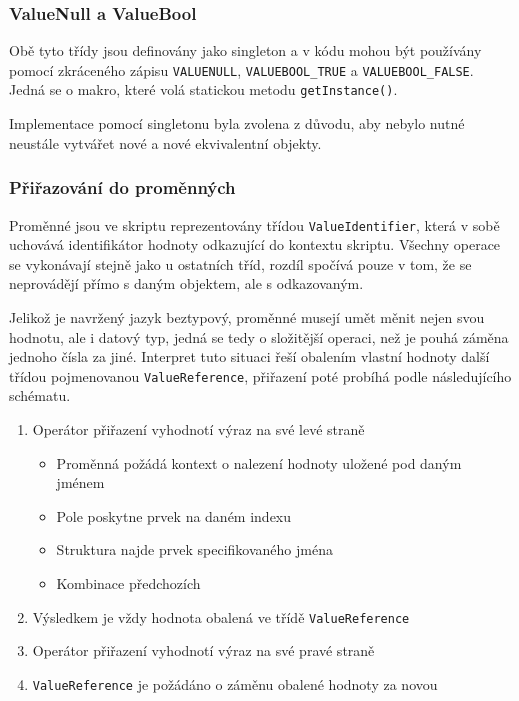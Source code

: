 \documentclass[11pt,twoside,a4paper]{book}
\begin{document}
\subsubsection{ValueNull a ValueBool}

Obě tyto třídy jsou definovány jako singleton a v kódu mohou být používány pomocí zkrá\-ce\-né\-ho zápisu \texttt{VALUENULL}, \texttt{VALUEBOOL\_TRUE} a \texttt{VALUEBOOL\_FALSE}. Jedná se o makro, které volá statickou metodu \texttt{getInstance()}.

Implementace pomocí singletonu byla zvolena z důvodu, aby nebylo nutné neustále vytvářet nové a nové ekvivalentní objekty.


\subsubsection{Přiřazování do proměnných}
\label{valuereference_a_prirazovani_do_promennych}

Proměnné jsou ve skriptu reprezentovány třídou \texttt{ValueIdentifier}, která v sobě u\-cho\-vá\-vá identifikátor hodnoty odkazující do kontextu skriptu. Všechny operace se vykonávají stejně jako u ostatních tříd, rozdíl spočívá pouze v tom, že se neprovádějí přímo s daným objektem, ale s odkazovaným.

Jelikož je navržený jazyk beztypový, proměnné musejí umět měnit nejen svou hodnotu, ale i datový typ, jedná se tedy o složitější operaci, než je pouhá záměna jednoho čísla za jiné. Interpret tuto situaci řeší obalením vlastní hodnoty další třídou pojmenovanou \texttt{ValueReference}, přiřazení poté probíhá podle následujícího schématu.

\begin{enumerate}
\item Operátor přiřazení vyhodnotí výraz na své levé straně
	\begin{itemize}
	\item Proměnná požádá kontext o nalezení hodnoty uložené pod daným jménem
	\item Pole poskytne prvek na daném indexu
	\item Struktura najde prvek specifikovaného jména
	\item Kombinace předchozích
	\end{itemize}
\item Výsledkem je vždy hodnota obalená ve třídě \texttt{ValueReference}
\item Operátor přiřazení vyhodnotí výraz na své pravé straně
\item \texttt{ValueReference} je požádáno o záměnu obalené hodnoty za novou
\end{enumerate}
\end{document}
